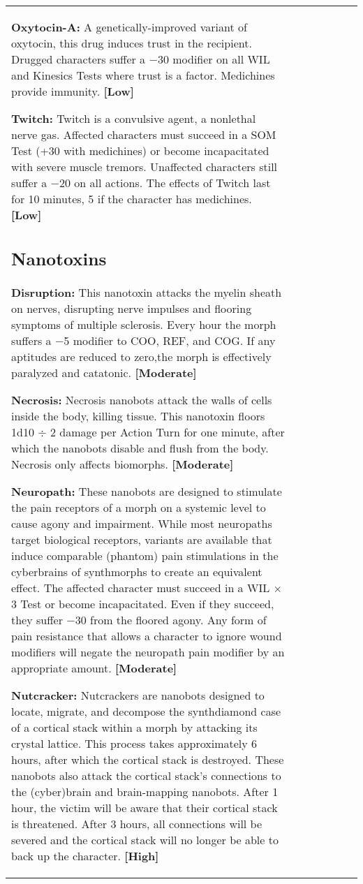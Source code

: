 \begin{tabular}{|l|l|l|l|l|l|l|}
\textbf{Oxytocin-A:} A genetically-improved variant of oxytocin, this drug induces trust in the recipient. Drugged characters suffer a $-$30 modifier on all WIL and Kinesics Tests where trust is a factor. Medichines provide immunity. \textbf{[Low]} 

\textbf{Twitch:} Twitch is a convulsive agent, a nonlethal nerve gas. Affected characters must succeed in a SOM Test (+30 with medichines) or become incapacitated with severe muscle tremors. Unaffected characters still suffer a $-$20 on all actions. The effects of Twitch last for 10 minutes, 5 if the character has medichines. \textbf{[Low]} 



\subsection{Nanotoxins} \label{sec:nanotoxins} 

\textbf{Disruption:} This nanotoxin attacks the myelin sheath on nerves, disrupting nerve impulses and flooring symptoms of multiple sclerosis. Every hour the morph suffers a $-$5 modifier to COO, REF, and COG. If any aptitudes are reduced to zero,the morph is effectively paralyzed and catatonic. \textbf{[Moderate]} 

\textbf{Necrosis:} Necrosis nanobots attack the walls of cells inside the body, killing tissue. This nanotoxin floors 1d10 $\div$ 2 damage per Action Turn for one minute, after which the nanobots disable and flush from the body. Necrosis only affects biomorphs. \textbf{[Moderate]} 

\textbf{Neuropath:} These nanobots are designed to stimulate the pain receptors of a morph on a systemic level to cause agony and impairment. While most neuropaths target biological receptors, variants are available that induce comparable (phantom) pain stimulations in the cyberbrains of synthmorphs to create an equivalent effect. The affected character must succeed in a WIL $\times$ 3 Test or become incapacitated. Even if they succeed, they suffer $-$30 from the floored agony. Any form of pain resistance that allows a character to ignore wound modifiers will negate the neuropath pain modifier by an appropriate amount. \textbf{[Moderate]} 

\textbf{Nutcracker:} Nutcrackers are nanobots designed to locate, migrate, and decompose the synthdiamond case of a cortical stack within a morph by attacking its crystal lattice. This process takes approximately 6 hours, after which the cortical stack is destroyed. These nanobots also attack the cortical stack’s connections to the (cyber)brain and brain-mapping nanobots. After 1 hour, the victim will be aware that their cortical stack is threatened. After 3 hours, all connections will be severed and the cortical stack will no longer be able to back up the character. \textbf{[High]} 




\end{tabular}
